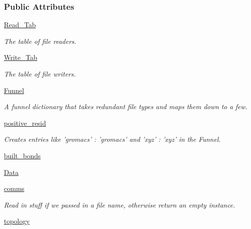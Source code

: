 \subsubsection*{Public Attributes}
\begin{DoxyCompactItemize}
\item 
\hyperlink{classforcebalance_1_1molecule_1_1Molecule_a35600d98f150597c9d9ac5129e01bd8d}{Read\-\_\-\-Tab}
\begin{DoxyCompactList}\small\item\em The table of file readers. \end{DoxyCompactList}\item 
\hyperlink{classforcebalance_1_1molecule_1_1Molecule_a85310a28c678cb386f9d2b584b24320d}{Write\-\_\-\-Tab}
\begin{DoxyCompactList}\small\item\em The table of file writers. \end{DoxyCompactList}\item 
\hyperlink{classforcebalance_1_1molecule_1_1Molecule_a491b10f21e93f841a770088402a13924}{Funnel}
\begin{DoxyCompactList}\small\item\em A funnel dictionary that takes redundant file types and maps them down to a few. \end{DoxyCompactList}\item 
\hyperlink{classforcebalance_1_1molecule_1_1Molecule_af9d8dc89fee54b2b89558633f2c9b70a}{positive\-\_\-resid}
\begin{DoxyCompactList}\small\item\em Creates entries like 'gromacs' \-: 'gromacs' and 'xyz' \-: 'xyz' in the Funnel. \end{DoxyCompactList}\item 
\hyperlink{classforcebalance_1_1molecule_1_1Molecule_aeb5135f20e02b98900b6fa3fbab9822d}{built\-\_\-bonds}
\item 
\hyperlink{classforcebalance_1_1molecule_1_1Molecule_a69c18c3fad45cd38102d9582445f5c6d}{Data}
\item 
\hyperlink{classforcebalance_1_1molecule_1_1Molecule_adf9f25ebcf955be562ef186b822e237a}{comms}
\begin{DoxyCompactList}\small\item\em Read in stuff if we passed in a file name, otherwise return an empty instance. \end{DoxyCompactList}\item 
\hyperlink{classforcebalance_1_1molecule_1_1Molecule_a57facdb1b7e71fabfad0df72a7ff94f5}{topology}

\end{DoxyCompactItemize}
